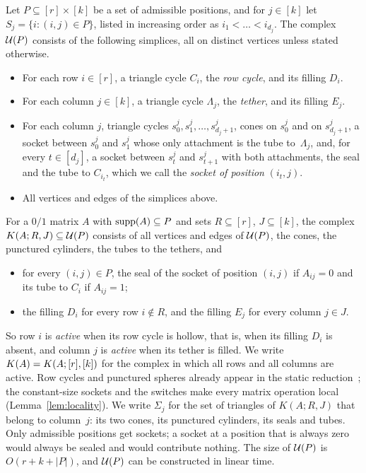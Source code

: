 

\begin{definition}\label{def:gadget}
Let $P\subseteq[r]\times[k]$ be a set of admissible positions, and for $j\in[k]$ let $S_j=\{i:(i,j)\in P\}$, listed in increasing order as $i_1<\dots<i_{d_j}$.
The complex $\mathcal{U}(P)$ consists of the following simplices, all on distinct vertices unless stated otherwise.
\begin{itemize}
\item For each row $i\in[r]$, a triangle cycle $C_i$, the \emph{row cycle}, and its filling $D_i$.
\item For each column $j\in[k]$, a triangle cycle $\Lambda_j$, the \emph{tether}, and its filling $E_j$.
\item For each column $j$, triangle cycles $s^j_0,s^j_1,\dots,s^j_{d_j+1}$, cones on $s^j_0$ and on $s^j_{d_j+1}$, a socket between $s^j_0$ and $s^j_1$ whose only attachment is the tube to~$\Lambda_j$, and, for every $t\in[d_j]$, a socket between $s^j_t$ and $s^j_{t+1}$ with both attachments, the seal and the tube to $C_{i_t}$, which we call the \emph{socket of position} $(i_t,j)$.
\item All vertices and edges of the simplices above.
\end{itemize}
For a $0/1$ matrix $A$ with $\operatorname{supp}(A)\subseteq P$ and sets $R\subseteq[r]$, $J\subseteq[k]$, the complex $K(A;R,J)\subseteq\mathcal{U}(P)$ consists of all vertices and edges of $\mathcal{U}(P)$, the cones, the punctured cylinders, the tubes to the tethers, and
\begin{itemize}
\item for every $(i,j)\in P$, the seal of the socket of position $(i,j)$ if $A_{ij}=0$ and its tube to $C_i$ if $A_{ij}=1$;
\item the filling $D_i$ for every row $i\notin R$, and the filling $E_j$ for every column $j\in J$.
\end{itemize}
\end{definition}

So row $i$ is \emph{active} when its row cycle is hollow, that is, when its filling $D_i$ is absent, and column $j$ is \emph{active} when its tether is filled.
We write $K(A)=K(A;[r],[k])$ for the complex in which all rows and all columns are active.
Row cycles and punctured spheres already appear in the static reduction~\cite[Theorem~3.1]{EP14}; the constant-size sockets and the switches make every matrix operation local (Lemma~\ref{lem:locality}).
We write $\Sigma_j$ for the set of triangles of $K(A;R,J)$ that belong to column~$j$: its two cones, its punctured cylinders, its seals and tubes.
Only admissible positions get sockets; a socket at a position that is always zero would always be sealed and would contribute nothing.
The size of $\mathcal{U}(P)$ is $O(r+k+|P|)$, and $\mathcal{U}(P)$ can be constructed in linear time.

